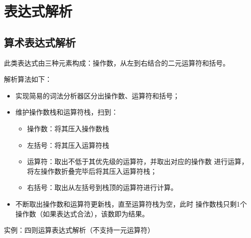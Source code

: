 \section{表达式解析}
\subsection{算术表达式解析}
此类表达式由三种元素构成：操作数，从左到右结合的二元运算符和括号。

解析算法如下：
\begin{itemize}
	\item 实现简易的词法分析器区分出操作数、运算符和括号；
	\item 维护操作数栈和运算符栈，扫到：
	      \begin{itemize}
		      \item 操作数：将其压入操作数栈
		      \item 左括号：将其压入运算符栈
		      \item 运算符：取出不低于其优先级的运算符，并取出对应的操作数
		            进行运算，将左操作数折叠完毕后将其压入运算符栈；
		      \item 右括号：取出从左括号到栈顶的运算符进行计算。
	      \end{itemize}
	\item 不断取出操作数和运算符更新栈，直至运算符栈为空，此时
	      操作数栈只剩1个操作数（如果表达式合法），该数即为结果。
\end{itemize}

实例：四则运算表达式解析（不支持一元运算符）

